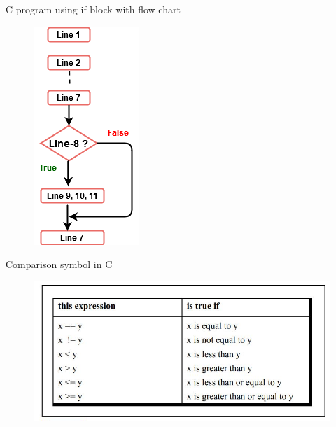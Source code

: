 \documentclass[10pt,a4paper]{beamer}
\begin{document}
     \begin{frame}{C program using if block with flow chart}
          \begin{minipage}{0.7\textwidth}
                
            \end{minipage}%
            \begin{minipage}{0.3\textwidth}
                \begin{figure}
            	    \centering
            	    \includegraphics[height=6 cm, width=3 cm]{images/flow_chart-if-block.png}
            
        	\end{figure}
        \end{minipage}
     \end{frame}
      
    \begin{frame}{Comparison symbol in C}
            \begin{figure}
            	    \centering
            	    \includegraphics[height=5 cm, width=6 cm]{images/Logical_comparision_table.JPG}
            	   
        	\end{figure}
        
    \end{frame}
        
        
        
\end{document}

